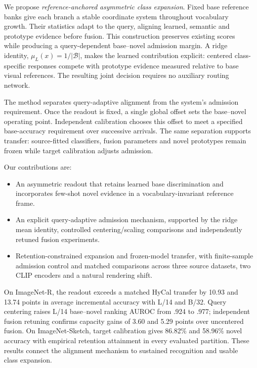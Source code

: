 \documentclass[preprint,review,12pt]{elsarticle}
\begin{document}
We propose \emph{reference-anchored asymmetric class expansion}. Fixed base reference banks give each branch a stable coordinate system throughout vocabulary growth. Their statistics adapt to the query, aligning learned, semantic and prototype evidence before fusion. This construction preserves existing scores while producing a query-dependent base--novel admission margin. A ridge identity, $\mu_L(x)=1/|\mathcal B|$, makes the learned contribution explicit: centered class-specific responses compete with prototype evidence measured relative to base visual references. The resulting joint decision requires no auxiliary routing network.

The method separates query-adaptive alignment from the system's admission requirement. Once the readout is fixed, a single global offset sets the base--novel operating point. Independent calibration chooses this offset to meet a specified base-accuracy requirement over successive arrivals. The same separation supports transfer: source-fitted classifiers, fusion parameters and novel prototypes remain frozen while target calibration adjusts admission.

Our contributions are:
\begin{itemize}
\item An asymmetric readout that retains learned base discrimination and incorporates few-shot novel evidence in a vocabulary-invariant reference frame.
\item An explicit query-adaptive admission mechanism, supported by the ridge mean identity, controlled centering/scaling comparisons and independently retuned fusion experiments.
\item Retention-constrained expansion and frozen-model transfer, with finite-sample admission control and matched comparisons across three source datasets, two CLIP encoders and a natural rendering shift.
\end{itemize}

On ImageNet-R, the readout exceeds a matched HyCal transfer by 10.93 and 13.74 points in average incremental accuracy with L/14 and B/32. Query centering raises L/14 base--novel ranking AUROC from .924 to .977; independent fusion retuning confirms capacity gains of 3.60 and 5.29 points over uncentered fusion. On ImageNet-Sketch, target calibration gives 86.82\% and 58.96\% novel accuracy with empirical retention attainment in every evaluated partition. These results connect the alignment mechanism to sustained recognition and usable class expansion.
\end{document}

